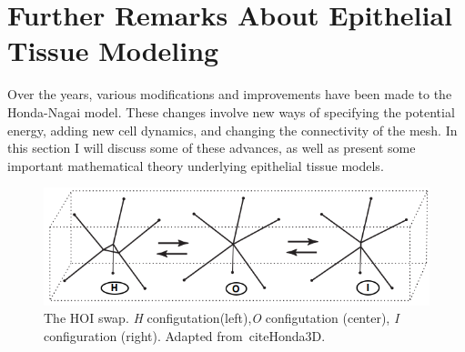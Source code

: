 \section{Further Remarks About Epithelial Tissue Modeling}
Over the years, various modifications and improvements have been made to the Honda-Nagai model. These changes involve new ways of specifying the potential energy, adding new cell dynamics, and changing the connectivity of the mesh. In this section I will discuss some of these advances, as well as present some important mathematical theory underlying epithelial tissue models.


\begin{figure}
\centering
\includegraphics[width=\textwidth]{../diagrams/hoi.png}
\caption[The HOI swap.]{The HOI swap. \emph{H} configutation(left),\emph{O} configutation (center), \emph{I} configuration (right). Adapted from~cite{Honda3D}.}
\label{fig:hoi}
\end{figure}

